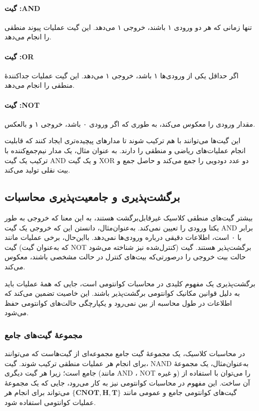\paragraph{گیت :AND}
تنها زمانی که هر دو ورودی ۱ باشند، خروجی ۱ می‌دهد. این گیت عملیات پیوند منطقی را انجام می‌دهد.

\paragraph{گیت :OR}
اگر حداقل یکی از ورودی‌ها ۱ باشد، خروجی ۱ می‌دهد. این گیت عملیات جداکنندهٔ منطقی را انجام می‌دهد.

\paragraph{گیت :NOT}
مقدار ورودی را معکوس می‌کند، به طوری که اگر ورودی ۰ باشد، خروجی ۱ و بالعکس.

این گیت‌ها می‌توانند با هم ترکیب شوند تا مدارهای پیچیده‌تری ایجاد کنند که قابلیت انجام عملیات‌های ریاضی و منطقی را دارند. به عنوان مثال، یک مدار نیم‌جمع‌کننده با ترکیب یک گیت AND و یک گیت XOR دو عدد دودویی را جمع می‌کند و حاصل جمع و بیت نقلی تولید می‌کند.

\subsection{برگشت‌پذیری و جامعیت‌پذیری محاسبات}
بیشتر گیت‌های منطقی کلاسیک غیرقابل‌برگشت هستند، به این معنا که خروجی به طور یکتا ورودی را تعیین نمی‌کند. به‌عنوان‌مثال، دانستن این که خروجی یک گیت AND برابر با ۰ است، اطلاعات دقیقی درباره ورودی‌ها نمی‌دهد. بااین‌حال، برخی عملیات مانند گیت  (که به‌عنوان گیت NOT کنترل‌شده نیز شناخته می‌شود) برگشت‌پذیر هستند. گیت  حالت بیت خروجی را درصورتی‌که بیت‌های کنترل در حالت مشخصی باشند، معکوس می‌کند.

برگشت‌پذیری یک مفهوم کلیدی در محاسبات کوانتومی است، جایی که همهٔ عملیات باید به دلیل قوانین مکانیک کوانتومی برگشت‌پذیر باشند. این خاصیت تضمین می‌کند که اطلاعات در طول محاسبه از بین نمی‌رود و یکپارچگی حالت‌های کوانتومی حفظ می‌شود.
\subsubsection{مجموعهٔ گیت‌های جامع}
در محاسبات کلاسیک، یک مجموعهٔ گیت جامع مجموعه‌ای از گیت‌هاست که می‌توانند برای انجام هر عملیات منطقی ترکیب شوند. گیت، NAND به‌عنوان‌مثال، یک مجموعهٔ جامع است؛ زیرا هر گیت دیگری (مانند AND ، NOT و غیره) را می‌توان با استفاده از آن ساخت. این مفهوم در محاسبات کوانتومی نیز به کار می‌رود، جایی که یک مجموعهٔ گیت‌های کوانتومی جامع و عمومی مانند $\mathbf{\{CNOT, H, T\}}$ می‌تواند برای انجام هر عملیات کوانتومی استفاده شود.

